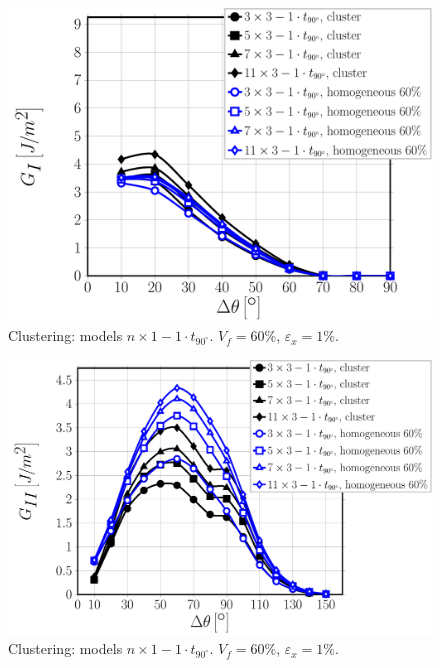 \documentclass[review]{elsarticle}
\begin{document}
\begin{figure}[!h]
\centering
\includegraphics[width=\textwidth]{nx1-1t90-vf60-GI.pdf}
\caption{Clustering: models $n\times 1-1\cdot t_{90^{\circ}}$. $V_{f}=60\%$, $\varepsilon_{x}=1\%$.}\label{fig:debonddebondGI}
\end{figure}

\begin{figure}[!h]
\centering
\includegraphics[width=\textwidth]{nx1-1t90-vf60-GII.pdf}
\caption{Clustering: models $n\times 1-1\cdot t_{90^{\circ}}$. $V_{f}=60\%$, $\varepsilon_{x}=1\%$.}\label{fig:debonddebondGI}
\end{figure}
\end{document}
